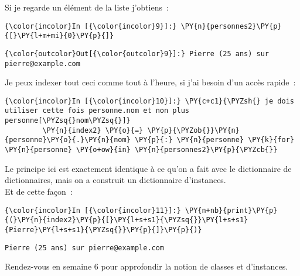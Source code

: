     Si je regarde un élément de la liste j'obtiens~:

    \begin{Verbatim}[commandchars=\\\{\}]
{\color{incolor}In [{\color{incolor}9}]:} \PY{n}{personnes2}\PY{p}{[}\PY{l+m+mi}{0}\PY{p}{]}
\end{Verbatim}


\begin{Verbatim}[commandchars=\\\{\}]
{\color{outcolor}Out[{\color{outcolor}9}]:} Pierre (25 ans) sur pierre@example.com
\end{Verbatim}
            
    Je peux indexer tout ceci comme tout à l'heure, si j'ai besoin d'un
accès rapide~:

    \begin{Verbatim}[commandchars=\\\{\}]
{\color{incolor}In [{\color{incolor}10}]:} \PY{c+c1}{\PYZsh{} je dois utiliser cette fois personne.nom et non plus personne[\PYZsq{}nom\PYZsq{}]}
         \PY{n}{index2} \PY{o}{=} \PY{p}{\PYZob{}}\PY{n}{personne}\PY{o}{.}\PY{n}{nom} \PY{p}{:} \PY{n}{personne} \PY{k}{for} \PY{n}{personne} \PY{o+ow}{in} \PY{n}{personnes2}\PY{p}{\PYZcb{}}
\end{Verbatim}


    Le principe ici est exactement identique à ce qu'on a fait avec le
dictionnaire de dictionnaires, mais on a construit un dictionnaire
d'instances.\\

Et de cette façon~:

    \begin{Verbatim}[commandchars=\\\{\}]
{\color{incolor}In [{\color{incolor}11}]:} \PY{n+nb}{print}\PY{p}{(}\PY{n}{index2}\PY{p}{[}\PY{l+s+s1}{\PYZsq{}}\PY{l+s+s1}{Pierre}\PY{l+s+s1}{\PYZsq{}}\PY{p}{]}\PY{p}{)}
\end{Verbatim}


    \begin{Verbatim}[commandchars=\\\{\}]
Pierre (25 ans) sur pierre@example.com

    \end{Verbatim}

    Rendez-vous en semaine 6 pour approfondir la notion de classes et
d'instances.